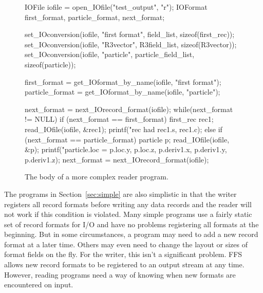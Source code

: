 \begin{figure}
\begin{Code}
    IOFile iofile = open_IOfile("test_output", "r");
    IOFormat first_format, particle_format, next_format;

    set_IOconversion(iofile, "first format", field_list, sizeof(first_rec));
    set_IOconversion(iofile, "R3vector", R3field_list, sizeof(R3vector));
    set_IOconversion(iofile, "particle", particle_field_list, sizeof(particle));

    first_format = get_IOformat_by_name(iofile, "first format");
    particle_format = get_IOformat_by_name(iofile, "particle");

    next_format = next_IOrecord_format(iofile);
    while(next_format != NULL) {
        if (next_format == first_format) {
            first_rec rec1;
            read_IOfile(iofile, &rec1);
            printf("rec had %
                   rec1.s, rec1.c);
        } else if (next_format == particle_format) {
            particle p;
            read_IOfile(iofile, &p);
            printf("particle.loc = %
                   p.loc.y, p.loc.z, p.deriv1.x, p.deriv1.y, p.deriv1.z); 
        }
        next_format = next_IOrecord_format(iofile);
    }
\end{Code}
\caption{The body of a more complex reader program.\label{fig:complexread}}
\end{figure}

The programs in Section~\ref{sec:simple} are also simplistic in that the
writer registers all record formats before writing any data records and the
reader will not work if this condition is violated.  Many simple programs
use a fairly static set of record formats for I/O and have no problems
registering all formats at the beginning.  But in some circumstances,
a program may need to add a new record format at a later time.  Others may
even need to change the layout or sizes of format fields on the fly.  For the
writer, this isn't a significant problem.  FFS allows new record formats to
be registered to an output stream at any time.  However, reading programs
need a way of knowing when new formats are encountered on input.  

